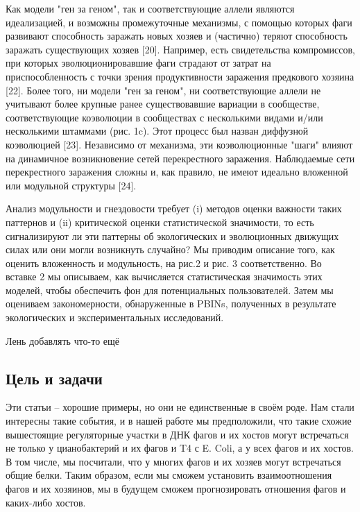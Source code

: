 \documentclass[a4paper,12pt]{article}
\begin{document}
    \par{Как модели "ген за геном", так и соответствующие аллели являются идеализацией, и возможны промежуточные 
    механизмы, с помощью которых фаги развивают способность заражать новых хозяев и (частично) теряют способность 
    заражать существующих хозяев [20]. Например, есть свидетельства компромиссов, при которых эволюционировавшие фаги 
    страдают от затрат на приспособленность с точки зрения продуктивности заражения предкового хозяина [22]. Более 
    того, ни модели "ген за геном", ни соответствующие аллели не учитывают более крупные ранее существовавшие вариации 
    в сообществе, соответствующие коэволюции в сообществах с несколькими видами и/или несколькими штаммами (рис. 1c). 
    Этот процесс был назван диффузной коэволюцией [23]. Независимо от механизма, эти коэволюционные "шаги" влияют на 
    динамичное возникновение сетей перекрестного заражения. Наблюдаемые сети перекрестного заражения сложны и, как 
    правило, не имеют идеально вложенной или модульной структуры [24].}
    
    \par{Анализ модульности и гнездовости требует (i) методов оценки важности таких паттернов и (ii) критической оценки
    статистической значимости, то есть сигнализируют ли эти паттерны об экологических и эволюционных движущих силах или
    они могли возникнуть случайно? Мы приводим описание того, как оценить вложенность и модульность, на рис.2 и рис. 3 
    соответственно. Во вставке 2 мы описываем, как вычисляется статистическая значимость этих моделей, чтобы обеспечить
    фон для потенциальных пользователей. Затем мы оцениваем закономерности, обнаруженные в PBINs, полученных в 
    результате экологических и экспериментальных исследований.}
    
    \par{{\Large Лень добавлять что-то ещё}}
    
\newpage
\begin{center}
\section{Цель и задачи} \label{sec:code}
\end{center}

\par{Эти статьи – хорошие примеры, но они не единственные в своём роде. Нам стали интересны такие события, и в нашей
    работе мы предположили, что такие схожие вышестоящие регуляторные участки в ДНК фагов и их хостов могут встречаться
    не только у цианобактерий и их фагов и T4 с E. Coli, а у всех фагов и их хостов. В том числе, мы посчитали, что у
    многих фагов и их хозяев могут встречаться общие белки. Таким образом, если мы сможем установить взаимоотношения
    фагов и их хозяинов, мы в будущем сможем прогнозировать отношения фагов и каких-либо хостов.}
\end{document}
